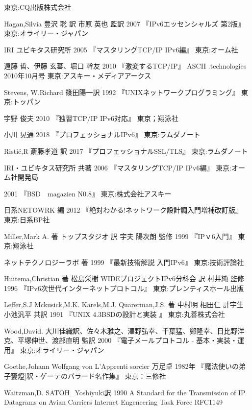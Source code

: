 \begin{thebibliography}{99}
    東京:CQ出版株式会社	
\item
	Hagan,Silvia
	豊沢 聡 訳
	市原 英也 監訳
	2007
	『IPv6エッセンシャルズ 第2版』
	東京:オライリー・ジャパン
\item
	IRI
	ユビキタス研究所
	2005
	『マスタリングTCP/IP IPv6編』
	東京:オーム社
\item
	遠藤 哲、伊藤 玄蕃、堀口 幹友
	2010
	『激変するTCP/IP』
	ASCII .technologies 2010年10月号
	東京:アスキー・メディアアークス
\item
    Stevens, W.Richard
	篠田陽一訳
	1992
	『UNIXネットワークプログラミング』
	東京:トッパン
\item
    宇野 俊夫
    2010
    『独習TCP/IP IPv6対応』
    東京；翔泳社
\item
    小川 晃通
    2018
    『プロフェッショナルIPv6』
    東京:ラムダノート    
\item
    Risti\'{c},R
    斎藤孝道 訳
    2017
    『プロフェッショナルSSL/TLS』
    東京:ラムダノート
\item
	IRI・ユビキタス研究所 共著
	2006
	『マスタリングTCP/IP IPv6編』
	東京:オーム社開発局
\item
	2001
	『BSD　magazien N0.8』
	東京:株式会社アスキー
\item
	日系NETOWRK 編
	2012
	『絶対わかる!ネットワーク設計調入門増補改訂版』
	東京:日系BP社
\item
	Miller,Mark A. 著
	トップスタジオ 訳
	宇夫 陽次朗 監修
	1999
	『IPｖ6入門』
	東京:翔泳社
\item
	ネットテクノロジーラボ 著
	1999
	『最新技術解説 入門IPv6』
	東京:技術評論社
\item
	Huitema,Christian 著
	松島栄樹 WIDEプロジェクトIPv6分科会 訳
	村井純 監修
	1996
	『IPv6次世代インターネットプロトコル』
	東京:プレンティスホール出版
\item
	Leffer,S.J Mckusick,M.K. Karels,M.J. Quarerman,J.S. 著
	中村明 相田仁 計宇生 小池汎平 共訳
	1991
	『UNIX 4.3BSDの設計と実装 』
	東京:丸善株式会社
\item
     Wood,David.
	大川佳織訳、佐々木雅之、澤野弘幸、千葉猛、鄭隆幸、日比野洋克、平塚伸世、渡部直明 監訳
	2000
	『電子メールプロトコル - 基本・実装・運用』
	東京:オライリー・ジャパン	
\item
      Goethe,Johann Wolfgang von
	L'Apprenti sorcier
	万足卓
	1982年
	『魔法使いの弟子窶燈]釈・ゲーテのバラード名作集』
	東京：三修社
\item
	Waitzman,D.
	SATOH\_Yoshiyuki訳
	1990
	A Standard for the Transmission of IP Datagrams on Avian Carriers Internet Engeneering Task Force RFC1149

\end{thebibliography}
